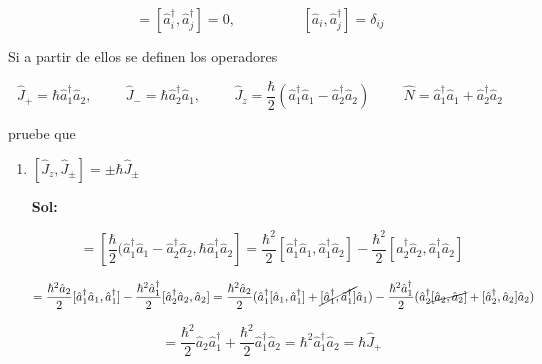 \documentclass[12pt,a4paper]{article}
\begin{document}
\begin{enumerate}
\begin{equation*}
    [\hat{a}_i,\hat{a}_j] = [\hat{a}_{i}^{\dagger},\hat{a}_{j}^{\dagger}] = 0, \hspace{2cm} [\hat{a}_i , \hat{a}_{j}^{\dagger}] = \delta_{ij}
\end{equation*}

Si a partir de ellos se definen los operadores 

\begin{equation*}
    \hat{J}_{+}= \hbar \hat{a}_{1}^{\dagger} \hat{a}_{2},\hspace{1cm} \hat{J}_{-} = \hbar \hat{a}_{2}^{\dagger}\hat{a}_{1}, \hspace{1cm} \hat{J}_{z} = \frac{\hbar}{2} (\hat{a}_{1}^{\dagger}\hat{a}_1 - \hat{a}_{2}^{\dagger}\hat{a}_2) \hspace{1cm} \hat{N} = \hat{a}_{1}^{\dagger}\hat{a}_1 + \hat{a}_{2}^{\dagger}\hat{a}_2
\end{equation*}

pruebe que 

\begin{enumerate}
    \item $[\hat{J}_{z},\hat{J}_{\pm}] = \pm \hbar \hat{J}_{\pm}$
    
    \textbf{Sol:}
    
    \begin{equation*}
        [\hat{J}_{z},\hat{J}_{+}] = [\frac{\hbar}{2} (\hat{a}_{1}^{\dagger} \hat{a}_{1} - \hat{a}_{2}^{\dagger} \hat{a}_{2}, \hbar \hat{a}_{1}^{\dagger} \hat{a}_2 ] = \frac{\hbar^2}{2}[\hat{a}_{1}^{\dagger}\hat{a}_{1}, \hat{a}_{1}^{\dagger}\hat{a}_{2}] - \frac{\hbar^2}{2}[\hat{a}_{2}^{\dagger}\hat{a}_{2},\hat{a}_{1}^{\dagger}\hat{a}_{2}]
    \end{equation*}
    
    \begin{equation*}
        = \frac{\hbar^2 \hat{a}_2}{2} [\hat{a}_{1}^{\dagger} \hat{a}_{1}, \hat{a}_{1}^{\dagger}] - \frac{\hbar^2 \hat{a}_{1}^{\dagger}}{2} [\hat{a}_{2}^{\dagger}\hat{a}_{2},\hat{a}_{2}] = \frac{\hbar^2 \hat{a}_2}{2}(\hat{a}_{1}^{\dagger}[\hat{a}_1,\hat{a}_{1}^{\dagger}] + \cancel{[\hat{a}_{1}^{\dagger}, \hat{a}_{1}^{\dagger}]}\hat{a}_1) - \frac{\hbar^2 \hat{a}_{1}^{\dagger}}{2}(\hat{a}_{2}^{\dagger}\cancel{[\hat{a}_2,\hat{a}_2]}+[\hat{a}_{2}^{\dagger}, \hat{a}_2] \hat{a}_2)
    \end{equation*}
    
    \begin{equation*}
        = \frac{\hbar^2}{2} \hat{a}_2 \hat{a}_{1}^{\dagger} + \frac{\hbar^2}{2} \hat{a}_{1}^{\dagger} \hat{a}_2 = \hbar^2 \hat{a}_{1}^{\dagger} \hat{a}_2 = \hbar \hat{J}_{+}
    \end{equation*}
    

\end{enumerate}
\end{enumerate}
\end{document}
